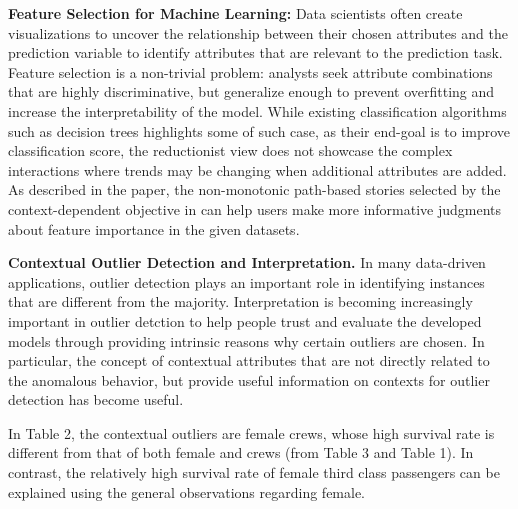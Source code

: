 \textbf{Feature Selection for Machine Learning:} Data scientists often create visualizations to uncover the relationship between their chosen attributes and the prediction variable to identify attributes that are relevant to the prediction task. Feature selection is a non-trivial problem: analysts seek attribute combinations that are highly discriminative, but generalize enough to prevent overfitting and increase the interpretability of the model. While existing classification algorithms such as decision trees highlights some of such case, as their end-goal is to improve classification score, the reductionist view does not showcase the complex interactions where trends may be changing when additional attributes are added. As described in the paper, the non-monotonic path-based stories selected by the context-dependent objective in \system can help users make more informative judgments about feature importance in the given datasets. 

\textbf{Contextual Outlier Detection and Interpretation.} In many data-driven applications, outlier detection plays an important role in identifying instances that are different from the majority. Interpretation is becoming increasingly important in outlier detction to help people trust and evaluate the developed models through providing intrinsic reasons why certain outliers are chosen. In particular, the concept of contextual attributes that are not directly related to the anomalous behavior, but provide useful information on contexts for outlier detection has become useful. 

In Table 2, the contextual outliers are female crews, whose high survival rate is different from that of both female and crews (from Table 3 and Table 1). In contrast, the relatively high survival rate of female third class passengers can be explained using the general observations regarding female.

